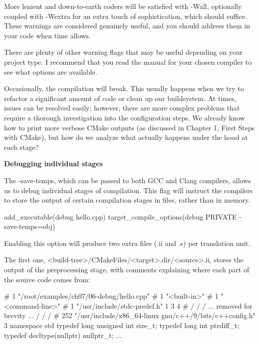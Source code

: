 More lenient and down-to-earth coders will be satisfied with -Wall, optionally coupled with -Wextra for an extra touch of sophistication, which should suffice. These warnings are considered genuinely useful, and you should address them in your code when time allows.

There are plenty of other warning flags that may be useful depending on your project type. I recommend that you read the manual for your chosen compiler to see what options are available.


Occasionally, the compilation will break. This usually happens when we try to refactor a significant amount of code or clean up our buildsystem. At times, issues can be resolved easily; however, there are more complex problems that require a thorough investigation into the configuration steps. We already know how to print more verbose CMake outputs (as discussed in Chapter 1, First Steps with CMake), but how do we analyze what actually happens under the hood at each stage?

\noindent
\textbf{Debugging individual stages}

The -save-temps, which can be passed to both GCC and Clang compilers, allows us to debug individual stages of compilation. This flag will instruct the compilers to store the output of certain compilation stages in files, rather than in memory.


\begin{cmake}
add_executable(debug hello.cpp)
target_compile_options(debug PRIVATE -save-temps=obj)
\end{cmake}

Enabling this option will produce two extra files (.ii and .s) per translation unit.

The first one, <build-tree>/CMakeFiles/<target>.dir/<source>.ii, stores the output of the preprocessing stage, with comments explaining where each part of the source code comes from:

\begin{shell}
# 1 "/root/examples/ch07/06-debug/hello.cpp"
# 1 "<built-in>"
# 1 "<command-line>"
# 1 "/usr/include/stdc-predef.h" 1 3 4
# / / / ... removed for brevity ... / / /
# 252 "/usr/include/x86_64-linux
  gnu/c++/9/bits/c++config.h" 3
namespace std
{
    typedef long unsigned int size_t;
    typedef long int ptrdiff_t;
    typedef decltype(nullptr) nullptr_t;
}
...
\end{shell}

